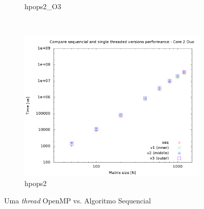 \documentclass[a4paper, 12pt]{article}
\begin{document}
\begin{figure}[H]
\begin{subfigure}[H]{0.5\textwidth}
        \caption{hpops2\_O3}
        \label{fig:hpops2_O3_cmp_single}
    \end{subfigure}
    ~ %
    \begin{subfigure}[H]{0.5\textwidth}
        \includegraphics[width=\textwidth]{cmp_single_thread_hpops2}
        \caption{hpops2}
        \label{fig:hpops2_cmp_single}
    \end{subfigure}
    \caption{Uma \textit{thread} OpenMP vs. Algoritmo Sequencial}\label{fig:animals}
\end{figure}

\newpage
\end{document}

